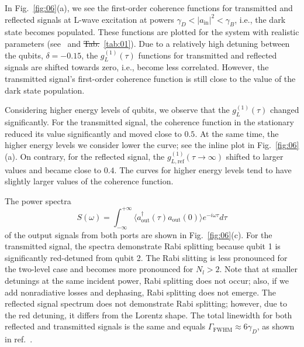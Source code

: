 \documentclass[lettersize,journal]{IEEEtran}
\providecommand{\DIFaddtex}[1]{{\protect\color{blue}\uwave{#1}}} %
\providecommand{\DIFdeltex}[1]{{\protect\color{red}\sout{#1}}}                      %
\providecommand{\DIFaddbegin}{} %
\providecommand{\DIFaddend}{} %
\providecommand{\DIFdelbegin}{} %
\providecommand{\DIFdelend}{} %
\providecommand{\DIFadd}[1]{\texorpdfstring{\DIFaddtex{#1}}{#1}} %
\providecommand{\DIFdel}[1]{\texorpdfstring{\DIFdeltex{#1}}{}} %
\newcommand{\DIFscaledelfig}{0.5}
\newlength{\DIFdelgraphicswidth} %
\newlength{\DIFdelgraphicsheight} %
\newcommand{\DIFaddincludegraphics}[2][]{{\color{blue}\fbox{\DIFOincludegraphics[#1]{#2}}}} %
\newcommand{\DIFdelincludegraphics}[2][]{%
\sbox{\DIFdelgraphicsbox}{\DIFOincludegraphics[#1]{#2}}%
\settoboxwidth{\DIFdelgraphicswidth}{\DIFdelgraphicsbox} %
\settoboxtotalheight{\DIFdelgraphicsheight}{\DIFdelgraphicsbox} %
\scalebox{\DIFscaledelfig}{%
\parbox[b]{\DIFdelgraphicswidth}{\usebox{\DIFdelgraphicsbox}\\[-\baselineskip] \rule{\DIFdelgraphicswidth}{0em}}\llap{\resizebox{\DIFdelgraphicswidth}{\DIFdelgraphicsheight}{%
\setlength{\unitlength}{\DIFdelgraphicswidth}%
\begin{picture}(1,1)%
\thicklines\linethickness{2pt} %
{\color[rgb]{1,0,0}\put(0,0){\framebox(1,1){}}}%
{\color[rgb]{1,0,0}\put(0,0){\line( 1,1){1}}}%
{\color[rgb]{1,0,0}\put(0,1){\line(1,-1){1}}}%
\end{picture}%
}\hspace*{3pt}}} %
} %
\DeclareRobustCommand{\DIFaddbegin}{\DIFOaddbegin \let\includegraphics\DIFaddincludegraphics} %
\DeclareRobustCommand{\DIFaddend}{\DIFOaddend \let\includegraphics\DIFOincludegraphics} %
\DeclareRobustCommand{\DIFdelbegin}{\DIFOdelbegin \let\includegraphics\DIFdelincludegraphics} %
\DeclareRobustCommand{\DIFdelend}{\DIFOaddend \let\includegraphics\DIFOincludegraphics} %
\begin{document}
In Fig.~\ref{fig:06}(a), we see the first-order coherence functions for transmitted and reflected signals at L-wave excitation at powers $\gamma_D < |a_\mathrm{in}|^2 < \gamma_B$, i.e., the dark state becomes populated.
These functions are plotted for the system with realistic parameters (see~\cite{rosario_hamann_nonreciprocity_2018} and \DIFdelbegin \DIFdel{Tab.}\DIFdelend \DIFaddbegin \DIFadd{Table}\DIFaddend ~\ref{tab:01}).
Due to a relatively high detuning between the qubits, $\delta = - 0.15$, the $g^{(1)}_L(\tau)$ functions for transmitted and reflected signals are shifted towards zero, i.e., become less correlated.
However, the transmitted signal's first-order coherence function is still close to the value of the dark state population.

Considering higher energy levels of qubits, we observe that the $g^{(1)}_L(\tau)$ changed significantly.
For the transmitted signal, the coherence function in the stationary reduced its value significantly and moved close to $0.5$.
At the same time, the higher energy levels we consider lower the curve; see the inline plot in Fig.~\ref{fig:06}(a).
On contrary, for the reflected signal, the $g^{(1)}_{L, \mathrm{ref}}(\tau \rightarrow \infty)$ shifted to larger values and became close to $0.4$.
The curves for higher energy levels tend to have slightly larger values of the coherence function.

The power spectra
\begin{equation} \label{eq:22}
S(\omega) = \int_{-\infty}^{+\infty} \langle a_\mathrm{out}^\dag(\tau) a_\mathrm{out}(0) \rangle e^{-i \omega \tau} d\tau
\end{equation}
of the output signals from both ports are shown in Fig.~\ref{fig:06}(c).
For the transmitted signal, the spectra demonstrate Rabi splitting because qubit 1 is significantly red-detuned from qubit 2.
The Rabi slitting is less pronounced for the two-level case and becomes more pronounced for $N_l > 2$.
Note that at smaller detunings at the same incident power, Rabi splitting does not occur; also, if we add nonradiative losses and dephasing, Rabi splitting does not emerge.
The reflected signal spectrum does not demonstrate Rabi splitting; however, due to the red detuning, it differs from the Lorentz shape.
The total linewidth for both reflected and transmitted signals is the same and equals $\Gamma_\mathrm{FWHM} \approx 6 \gamma_D$, as shown in ref.~\cite{rosario_hamann_nonreciprocity_2018}.
\end{document}
